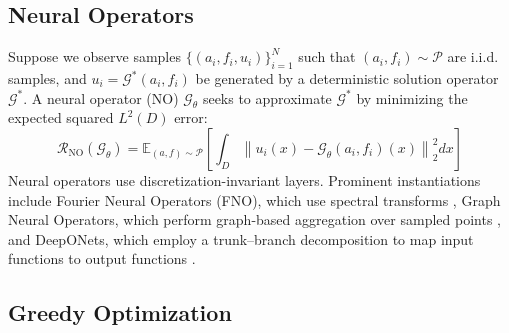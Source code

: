 \documentclass{article}
\begin{document}





\subsection{Neural Operators} \label{sec:neuraloperators}

Suppose we observe samples $\{(a_i, f_i, u_i)\}_{i = 1}^N$ such that $(a_i, f_i) \sim \mathcal{P}$ are i.i.d. samples, and $u_i = \mathcal{G}^{*}(a_i, f_i)$ be generated by a deterministic solution operator $\mathcal{G}^{*}$. 
A neural operator (NO) $\mathcal{G}_{\theta}$ seeks to approximate $\mathcal{G}^*$ by minimizing the expected squared $L^2(D)$ error:
\begin{equation*} 
    \mathcal{R}_{\text{NO}}(\mathcal{G}_{\theta})  = \mathbb{E}_{(a, f) \sim  \mathcal{P}}\left[ \int_{D} \left\|u_i(x) - \mathcal{G}_{\theta}(a_i, f_i)(x)\right\|_2^2dx\right]
\end{equation*}
Neural operators use discretization-invariant layers. Prominent instantiations include Fourier Neural Operators (FNO), which use spectral transforms \citep{li2020fourier}, Graph Neural Operators, which perform graph-based aggregation over sampled points \citep{li2020multipole}, and DeepONets, which employ a trunk–branch decomposition to map input functions to output functions \citep{lu2021learning}. 


\subsection{Greedy Optimization} \label{sec:bggreedy}
\end{document}
